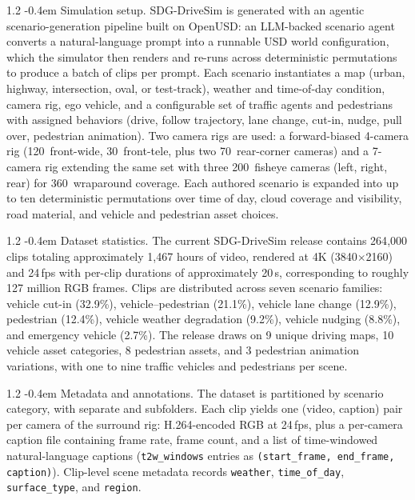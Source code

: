 \documentclass{llmxive}
\makeatletter
\providecommand{\paragraph}{  \@startsection{paragraph}{4}{\z@}    {1\baselineskip \@plus .2\baselineskip}    {-0.4em}    {\normalfont\normalsize\bfseries}}
\makeatother
\begin{document}
\paragraph{Simulation setup.}
\label{appendix:sdg_drive_simulation_setup}
SDG-DriveSim is generated with an agentic scenario-generation pipeline built on OpenUSD: an LLM-backed scenario agent converts a natural-language prompt into a runnable USD world configuration, which the simulator then renders and re-runs across deterministic permutations to produce a batch of clips per prompt. Each scenario instantiates a map (urban, highway, intersection, oval, or test-track), weather and time-of-day condition, camera rig, ego vehicle, and a configurable set of traffic agents and pedestrians with assigned behaviors (drive, follow trajectory, lane change, cut-in, nudge, pull over, pedestrian animation). Two camera rigs are used: a forward-biased 4-camera rig (120\textdegree~front-wide, 30\textdegree~front-tele, plus two 70\textdegree~rear-corner cameras) and a 7-camera rig extending the same set with three 200\textdegree~fisheye cameras (left, right, rear) for 360\textdegree~wraparound coverage. Each authored scenario is expanded into up to ten deterministic permutations over time of day, cloud coverage and visibility, road material, and vehicle and pedestrian asset choices.

\paragraph{Dataset statistics.}
\label{appendix:sdg_drive_dataset_statistics}
The current SDG-DriveSim release contains 264{,}000 clips totaling
approximately 1{,}467 hours of video, rendered at 4K (3840$\times$2160) and
24\,fps with per-clip durations of approximately 20\,s, corresponding to
roughly 127 million RGB frames. Clips are distributed across seven scenario families: vehicle cut-in (32.9\%),
vehicle--pedestrian (21.1\%), vehicle lane change (12.9\%), pedestrian (12.4\%),
vehicle weather degradation (9.2\%), vehicle nudging (8.8\%), and emergency
vehicle (2.7\%). The release draws on
9 unique driving maps, 10 vehicle asset categories,
8 pedestrian assets, and 3 pedestrian animation variations,
with one to nine traffic vehicles and pedestrians per scene.

\paragraph{Metadata and annotations.}
\label{appendix:sdg_drive_metadata_annotations}
The dataset is partitioned by scenario category, with separate  and  subfolders. Each clip yields one (video, caption) pair per camera of the surround rig: H.264-encoded RGB at 24\,fps, plus a per-camera caption file containing frame rate, frame count, and a list of time-windowed natural-language captions (\texttt{t2w\_windows} entries as \texttt{(start\_frame, end\_frame, caption)}). Clip-level scene metadata records \texttt{weather}, \texttt{time\_of\_day}, \texttt{surface\_type}, and \texttt{region}.
\end{document}

